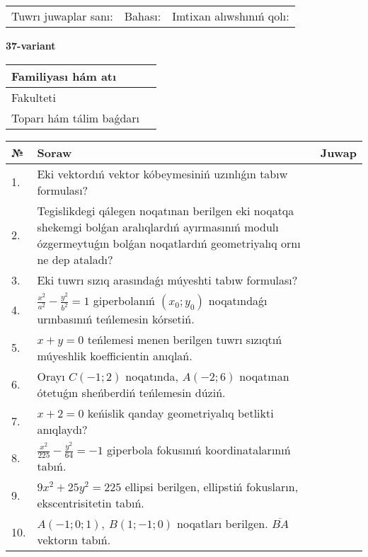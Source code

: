 \documentclass{article}
\begin{document}
\vspace{1cm}

\begin{tabular}{lll}
Tuwrı juwaplar sanı: \underline{\hspace{1.5cm}} & 
Bahası: \underline{\hspace{1.5cm}} & 
Imtixan alıwshınıń qolı: \underline{\hspace{2cm}} \\
\end{tabular}

\egroup

\newpage


\textbf{37-variant}\\

\bgroup
\def\arraystretch{1.6} %

\begin{tabular}{|m{5.7cm}|m{9.5cm}|}
\hline
Familiyası hám atı & \\
\hline
Fakulteti  & \\
\hline
Toparı hám tálim baǵdarı  & \\
\hline
\end{tabular}

\vspace{1cm}

\begin{tabular}{|m{0.7cm}|m{10cm}|m{4cm}|}
\hline
№ & Soraw & Juwap \\
\hline
1. & Eki vektordıń vektor kóbeymesiniń uzınlıǵın tabıw formulası? &  \\
\hline
2. & Tegislikdegi qálegen noqatınan berilgen eki noqatqa shekemgi bolǵan aralıqlardıń ayırmasınıń modulı ózgermeytuǵın bolǵan noqatlardıń geometriyalıq ornı ne dep ataladı? &  \\
\hline
3. & Eki tuwrı sızıq arasındaǵı múyeshti tabıw formulası? &  \\
\hline
4. & $\frac{x^2}{a^2}-\frac{y^2}{b^2}=1$ giperbolanıń $(x_0;y_0)$ noqatındaǵı urınbasınıń teńlemesin kórsetiń. &  \\
\hline
5. & $x+y=0$ teńlemesi menen berilgen tuwrı sızıqtıń múyeshlik koefficientin anıqlań. &  \\
\hline
6. & Orayı $C (-1;2)$ noqatında, $A (-2;6 )$ noqatınan ótetuǵın sheńberdiń teńlemesin dúziń. &  \\
\hline
7. & $x+2=0$ keńislik qanday geometriyalıq betlikti anıqlaydı? &  \\
\hline
8. & $\frac{x^{2}}{225}-\frac{y^{2}}{64}=-1$ giperbola fokusınıń koordinatalarınıń tabıń. &  \\
\hline
9. & $9x^{2}+25y^{2}=225$ ellipsi berilgen, ellipstiń fokusların, ekscentrisitetin tabıń. &  \\
\hline
10. & $A (-1;0;1),\ B (1;-1;0)$ noqatları berilgen. $\overline{BA}$ vektorın tabıń. &  \\
\hline
\end{tabular}
\end{document}
